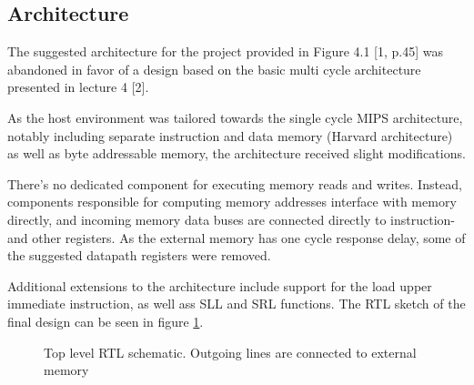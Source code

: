 \subsection{Architecture}

The suggested architecture for the project provided in Figure 4.1 [1, p.45] was abandoned in favor of a design based on the basic multi cycle architecture presented in lecture 4 [2].

As the host environment was tailored towards the single cycle MIPS architecture, notably including separate instruction and data memory (Harvard architecture) as well as byte addressable memory, the architecture received slight modifications.

There's no dedicated component for executing memory reads and writes.
Instead, components responsible for computing memory addresses interface with memory directly, and incoming memory data buses are connected directly to instruction- and other registers.
As the external memory has one cycle response delay, some of the suggested datapath registers were removed.

Additional extensions to the architecture include support for the load upper immediate instruction, as well ass SLL and SRL functions.
The RTL sketch of the final design can be seen in figure \ref{fig:top_level_rtl}.

\begin{figure}[ht!]
    \begin{center}
    \caption{Top level RTL schematic. Outgoing lines are connected to external memory}
    \label{fig:top_level_rtl}
    \end{center}
\end{figure}

